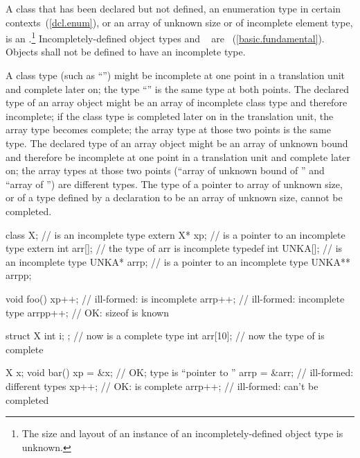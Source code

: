 \pnum
{}%
%
%
A class that has been declared but not defined, an enumeration type in certain
contexts~(\ref{dcl.enum}), or an array of unknown
size or of incomplete element type, is an .\footnote{The size and layout of an instance of an incompletely-defined
object type is unknown.}
Incompletely-defined object types and \cv\  are ~(\ref{basic.fundamental}). Objects shall not be defined to have an
incomplete type.

\pnum
A class type (such as ``'') might be incomplete at one
point in a translation unit and complete later on; the type
``'' is the same type at both points. The declared type
of an array object might be an array of incomplete class type and
therefore incomplete; if the class type is completed later on in the
translation unit, the array type becomes complete; the array type at
those two points is the same type. The declared type of an array object
might be an array of unknown bound and therefore be incomplete at one
point in a translation unit and complete later on; the array types at
those two points (``array of unknown bound of '' and ``array of
 '') are different types. The type of a pointer to array of
unknown size, or of a type defined by a  declaration to
be an array of unknown size, cannot be completed. \enterexample

%
\begin{codeblock}
class X;                        //  is an incomplete type
extern X* xp;                   //  is a pointer to an incomplete type
extern int arr[];               // the type of arr is incomplete
typedef int UNKA[];             //  is an incomplete type
UNKA* arrp;                     //  is a pointer to an incomplete type
UNKA** arrpp;

void foo() {
  xp++;                         // ill-formed:  is incomplete
  arrp++;                       // ill-formed: incomplete type
  arrpp++;                      // OK: sizeof  is known
}

struct X { int i; };            // now  is a complete type
int  arr[10];                   // now the type of  is complete

X x;
void bar() {
  xp = &x;                      // OK; type is ``pointer to ''
  arrp = &arr;                  // ill-formed: different types
  xp++;                         // OK:   is complete
  arrp++;                       // ill-formed:  can't be completed
}
\end{codeblock}
\exitexample 

